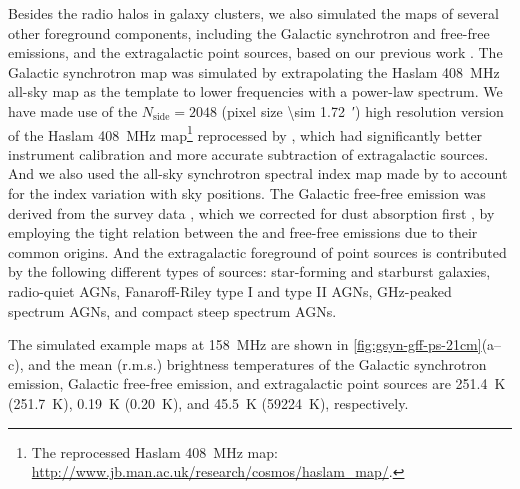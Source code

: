 \documentclass[modern]{aastex62}
\newcommand{\R}[1]{\mathrm{#1}}
\newcommand{\Halpha}{\text{H$\alpha$}}
\newcommand{\TODO}[1]{\textcolor{magenta}{[\textbf{TODO:}~\uuline{#1}]}}
\begin{document}
Besides the radio halos in galaxy clusters, we also simulated the maps of
several other foreground components, including the Galactic synchrotron
and free-free emissions, and the extragalactic point sources,
based on our previous work \citep[and references therein]{wang2010}.
The Galactic synchrotron map was simulated by extrapolating the
Haslam \SI{408}{\MHz} all-sky map as the template to lower frequencies
with a power-law spectrum.
We have made use of the $N_{\R{side}} = 2048$ (pixel size \SI{\sim 1.72}{\arcmin})
high resolution version of the Haslam \SI{408}{\MHz} map\footnote{%
  The reprocessed Haslam \SI{408}{\MHz} map:
  \url{http://www.jb.man.ac.uk/research/cosmos/haslam_map/}.
}
reprocessed by \citet{remazeilles2015}, which had significantly better
instrument calibration and more accurate subtraction of extragalactic
sources.
And we also used the all-sky synchrotron spectral index map made by
\citet{giardino2002} to account for the index variation with sky positions.
The Galactic free-free emission was derived from the \Halpha{} survey data
\citep{finkbeiner2003}, which we corrected for dust absorption first
\citep{dickinson2003}, by employing the tight relation between the \Halpha{}
and free-free emissions due to their common origins.
And the extragalactic foreground of point sources is contributed by the
following different types of sources: star-forming and starburst galaxies,
radio-quiet AGNs, Fanaroff-Riley type I and type II AGNs, GHz-peaked
spectrum AGNs, and compact steep spectrum AGNs.

The simulated example maps at \SI{158}{\MHz} are shown in
\autoref{fig:gsyn-gff-ps-21cm}(a--c),
and the mean (r.m.s.) brightness temperatures of the Galactic synchrotron
emission, Galactic free-free emission, and extragalactic point sources
are \SI{251.4}{\kelvin} (\SI{251.7}{\kelvin}),
\SI{0.19}{\kelvin} (\SI{0.20}{\kelvin}),
and \SI{45.5}{\kelvin} (\SI{59224}{\kelvin}), respectively.

\begin{figure*}
  \caption{\label{fig:gsyn-gff-ps-21cm}%
    The simulated example maps of other foreground components and
    the EoR 21~cm signal at \SI{158}{\MHz}.
    (a) Galactic synchrotron emission;
    (b) Galactic free-free emission;
    (c) Extragalactic point sources, color in logarithmic scale;
    (d) EoR 21~cm signal.
    All colorbars are in units of \si{\kelvin}.
    \TODO{add labels to figures; increase colorbar font}
  }
\end{figure*}
\end{document}
